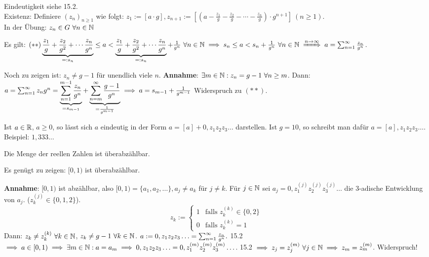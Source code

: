 \documentclass[a4paper,twoside,DIV15,BCOR12mm]{scrbook}
\begin{document}
\begin{beweis}
Eindeutigkeit siehe 15.2.\\
Existenz: Definiere $(z_n)_{n\ge1}$ wie folgt: $z_1:=[a\cdot g], z_{n+1} := [ ( a - \frac{z_1}{g} - \frac{z_2}{g} - \cdots -\frac{z_n}{g}) \cdot g^{n+1} ] \ (n\ge1)$. \\
In der Übung: $z_n \in G \ \forall n\in\mathbb{N}$

Es gilt: $(**) \underbrace{\frac{z_1}{g} + \frac{z_2}{g^2} + \cdots \frac{z_n}{g^n}}_{=: s_n} \le a < \underbrace{\frac{z_1}{g} + \frac{z_2}{g^2} + \cdots \frac{z_n}{g^n}}_{=: s_n} + \frac{1}{g^n} \ \forall n\in\MdN \folgt s_n \le a < s_n + \frac{1}{g^n} \ \forall n\in\MdN \folgtwegen{n\to\infty} a = \reihe{\frac{z_n}{g^n}}$.

Noch zu zeigen ist: $z_n \ne g-1$ für unendlich viele $n$.
\textbf{Annahme}: $\exists{m\in\ensuremath{\mathbb{N}}}: z_n = g-1 \ \forall n\ge m$.  Dann: $a = \sum_{n=1}^{\infty}{z_n}{g^n} = \underbrace{\sum_{n=1}^{m-1}{\frac{z_n}{g^n}}}_{= s_{m-1}} + \underbrace{\sum_{n=m}^\infty{\frac{g-1}{g^n}}}_{= \frac{1}{g^{m-1}}} \implies a = s_{m-1} + \frac{1}{g^{m-1}}$ Widerspruch zu $(**)$.
\end{beweis}

\begin{bemerkung}
Ist $a\in\mathbb{R}$, $a\ge0$, so lässt sich $a$ eindeutig in der Form $a = [a]+0,z_1z_2z_3\ldots$ darstellen. Ist $g=10$, so schreibt man dafür $a=[a],z_1z_2z_3\ldots$. Beispiel: $1,333\ldots$
\end{bemerkung}

\begin{satz}
Die Menge der reellen Zahlen ist überabzählbar.
\end{satz}

\begin{beweis}
Es genügt zu zeigen: $[0,1)$ ist überabzählbar.

\textbf{Annahme}: $[0,1)$ ist abzählbar, also $[0,1) = \{a_1,a_2,\ldots\}, a_j \ne a_k$ für $j\ne k$. 
F\"ur $j \in\mathbb{N}$ sei $a_j = 0,z_1^{(j)} z_2^{(j)} z_3^{(j)}\ldots$ die 3-adische Entwicklung von $a_j$. ($z_k^{(j)} \in \{0,1,2\}$).
$$ z_k := \begin{cases} 1 & \text{falls } z_k^{(k)} \in \{0,2\} \\0 & \text{falls } z_k^{(k)}= 1 \end{cases}$$
Dann: $z_k \ne z_k^{(k)} \ \forall k \in\mathbb{N}$, $z_k \ne g-1 \ \forall k\in\mathbb{N}$. $a := 0,z_1z_2z_3\ldots = \sum_{n=1}^{\infty}{\frac{z_n}{g^n}}.$ 15.2 $\implies a \in [0,1) \implies \exists m\in\mathbb{N}: a= a_m \implies 0,z_1z_2z_3\ldots = 0,z_1^{(m)}z_2^{(m)}z_3^{(m)}\ldots$. 15.2 $\implies z_j = z_j^{(m)} \ \forall j\in\mathbb{N} \implies z_m = z_m^{(m)}$. Widerspruch!
\end{beweis}
\end{document}
